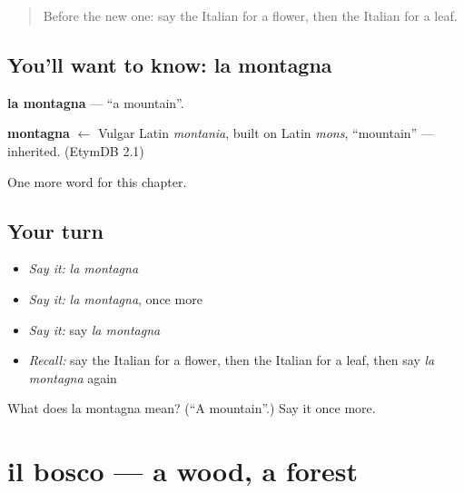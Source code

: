 \label{lesson:IT-C64-montagna}



\begin{quote}
Before the new one: say the Italian for a flower, then the Italian for a leaf.
\end{quote}

\subsection*{You'll want to know: la montagna}
\textbf{la montagna} — \textquotedblleft{}a mountain\textquotedblright{}.

\begin{cousinweb}
\textbf{montagna} $\leftarrow$ Vulgar Latin \emph{montania}, built on Latin \emph{mons}, \textquotedblleft{}mountain\textquotedblright{} — inherited. (EtymDB 2.1)
\end{cousinweb}

\begin{grammarlens}[title={What you've built}]
One more word for this chapter.
\end{grammarlens}

\subsection*{Your turn}
\begin{itemize}
\raggedright
  \item \emph{Say it:} \emph{la montagna}
  \item \emph{Say it:} \emph{la montagna}, once more
  \item \emph{Say it:} say \emph{la montagna}
  \item \emph{Recall:} say the Italian for a flower, then the Italian for a leaf, then say \emph{la montagna} again
\end{itemize}

\begin{tcolorbox}[breakable,colback=teal!4,colframe=teal!35!black,title={Before you move on}]
What does la montagna mean? (\textquotedblleft{}A mountain\textquotedblright{}.) Say it once more.
\end{tcolorbox}
\section[il bosco]{il bosco — a wood, a forest}

\label{lesson:IT-C64-bosco}



